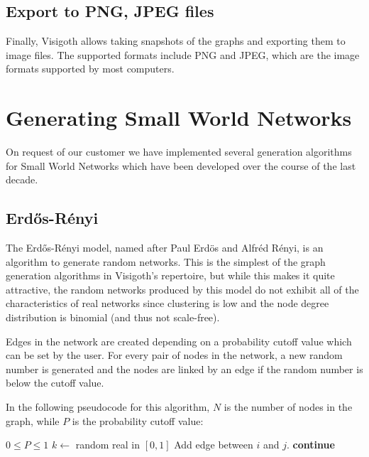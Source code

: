 \documentclass[a4paper,11pt,titlepage]{article}
\let\stdsection\section         %
\renewcommand{\section}{\newpage\stdsection}
\begin{document}
\subsection{Export to PNG, JPEG files}
Finally, Visigoth allows taking snapshots of the graphs and exporting them to
image files. The supported formats include PNG and JPEG, which are the image
formats supported by most computers.

\section{Generating Small World Networks}
\label{sec:algos}

On request of our customer we have implemented several generation
algorithms for Small World Networks which have been developed over
the course of the last decade.


\subsection{Erd\H{o}s-R\'{e}nyi}
The Erd\H{o}s-R\'{e}nyi model, named after Paul Erd\"{o}s and
Alfr\'{e}d R\'{e}nyi, is an algorithm to generate random networks.
This is the simplest of the graph generation algorithms in Visigoth's
repertoire, but while this makes it quite attractive,
the random networks produced by this model do not exhibit all of
the characteristics of real networks since clustering is low and
the node degree distribution is binomial (and thus not scale-free).

Edges in the network are created depending on a probability cutoff
value which can be set by the user. For every pair of nodes in the
network, a new random number is generated and the nodes are linked
by an edge if the random number is below the cutoff value.

In the following pseudocode for this algorithm, $N$ is the number
of nodes in the graph, while $P$ is the probability cutoff value:

\begin{algorithmic}
  \REQUIRE $0 \leq P \leq 1$
      \STATE $k \gets $ random real in $[0, 1]$
        \STATE Add edge between $i$ and $j$.
      \ELSE
        \STATE \textbf{continue}
      \ENDIF
    \ENDFOR
  \ENDFOR
\end{algorithmic}
\end{document}
